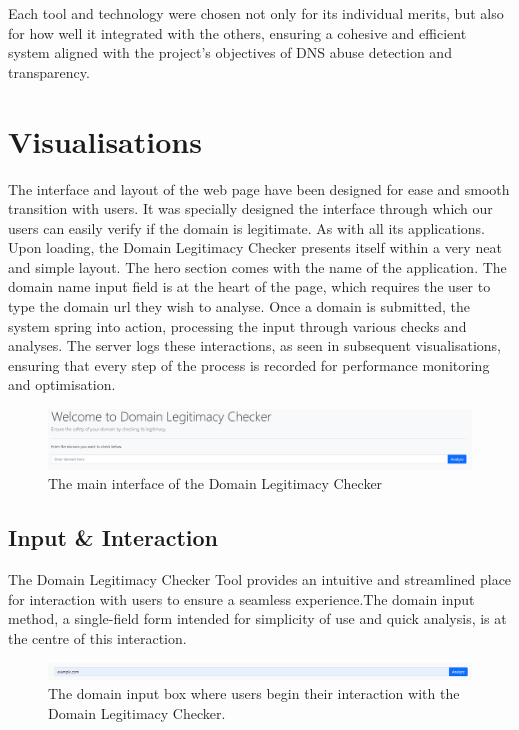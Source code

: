 Each tool and technology were chosen not only for its individual merits, but also for how well it integrated with the others, ensuring a cohesive and efficient system aligned with the project's objectives of DNS abuse detection and transparency.

\section{Visualisations}

The interface and layout of the web page have been designed for ease and smooth transition with users. It was specially designed the interface through which our users can easily verify if the domain is legitimate. As with all its applications. Upon loading, the Domain Legitimacy Checker presents itself within a very neat and simple layout. The hero section comes with the name of the application. The domain name input field is at the heart of the page, which requires the user to type the domain url they wish to analyse. Once a domain is submitted, the system spring into action, processing the input through various checks and analyses. The server logs these interactions, as seen in subsequent visualisations, ensuring that every step of the process is recorded for performance monitoring and optimisation.

\begin{figure}[H]
    \centering
    \includegraphics[width=1.1\linewidth]{project/image.png}
    \caption{The main interface of the Domain Legitimacy Checker}
    \label{fig:implem22}
\end{figure}

\subsection{Input \& Interaction}

 The Domain Legitimacy Checker Tool provides an intuitive and streamlined place for interaction with users to ensure a seamless experience.The domain input method, a single-field form intended for simplicity of use and quick analysis, is at the centre of this interaction.
 
\begin{figure} [H]
    \centering
    \includegraphics[width=1.1\linewidth]{project/6.png}
    \caption{The domain input box where users begin their interaction with the Domain Legitimacy Checker.}
    \label{fig:impl2}
\end{figure}

